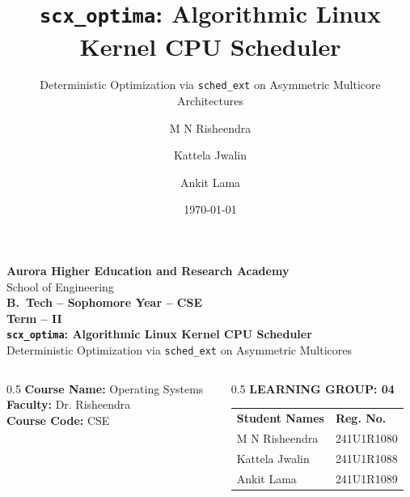 \documentclass{beamer}
\title[\texttt{scx\_optima}]{\texttt{scx\_optima}: Algorithmic Linux Kernel CPU Scheduler}
\subtitle{Deterministic Optimization via \texttt{sched\_ext} on Asymmetric Multicore Architectures}
\author[Group 04]{M N Risheendra \and Kattela Jwalin \and Ankit Lama}
\institute[Aurora]{Aurora Higher Education and Research Academy}
\date{\today}
\begin{document}
{
\begin{frame}[plain]
\vspace{0.2cm}
\begin{center}
{\footnotesize \textbf{Aurora Higher Education and Research Academy}}\\
{\footnotesize School of Engineering}\\[0.15cm]
{\footnotesize \textbf{B.~Tech -- Sophomore Year -- CSE}}\\[0.05cm]
{\footnotesize \textbf{Term -- II}}\\[0.25cm]
{\Large \textbf{\texttt{scx\_optima}: Algorithmic Linux Kernel CPU Scheduler}}\\[0.2cm]
{\small Deterministic Optimization via \texttt{sched\_ext} on Asymmetric Multicores}\\[0.3cm]
\begin{columns}[T]
\begin{column}{0.5\textwidth}
\footnotesize
\textbf{Course Name:} Operating Systems\\
\textbf{Faculty:} Dr. Risheendra\\
\textbf{Course Code:} CSE
\end{column}
\begin{column}{0.5\textwidth}
\footnotesize
\textbf{LEARNING GROUP: 04}\\[0.1cm]
\begin{tabular}{ll}
\textbf{Student Names} & \textbf{Reg. No.}\\
M N Risheendra & 241U1R1080\\
Kattela Jwalin & 241U1R1088\\
Ankit Lama & 241U1R1089\\
\end{tabular}
\end{column}
\end{columns}
\end{center}
\end{frame}
}
\end{document}
